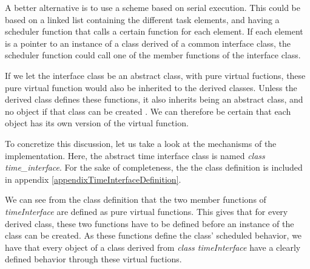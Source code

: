 	A better alternative is to use a scheme based on serial execution. %
	This could be based on a linked list containing the different task elements, and having a scheduler function that calls a certain function for each element.
	If each element is a pointer to an instance of a class derived of a common interface class, the scheduler function could call one of the member functions of the interface class.

	If we let the interface class be an abstract class, with pure virtual fuctions, these pure virtual function would also be inherited to the derived classes.
	Unless the derived class defines these functions, it also inherits being an abstract class, and no object if that class can be created \cite{Stroustrup2000KAP12}.
	We can therefore be certain that each object has its own version of the virtual function.

	To concretize this discussion, let us take a look at the mechanisms of the implementation.
	Here, the abstract time interface class is named \emph{class time\_interface}.
	For the sake of completeness, the the class definition is included in appendix \ref{appendixTimeInterfaceDefinition}. %

	We can see from the class definition that the two member functions of \emph{timeInterface} are defined as pure virtual functions.
	This gives that for every derived class, these two functions have to be defined before an instance of the class can be created.
	As these functions define the class' scheduled behavior, we have that every object of a class derived from \emph{class timeInterface} have a clearly defined behavior through these virtual fuctions.

